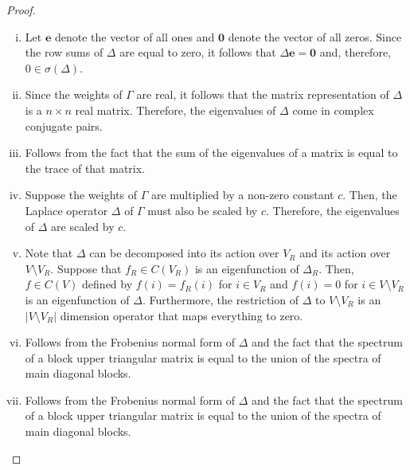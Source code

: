 \documentclass{article}
\newcommand\abs[1]{\left|#1\right|}
\begin{document}
\begin{proof}~
\begin{enumerate}[i.]
\item	Let $\textbf{e}$ denote the vector of all ones and $\textbf{0}$ denote the vector of all zeros. 
	Since the row sums of $\Delta$ are equal to zero, it follows that $\Delta\textbf{e}=\textbf{0}$ and, therefore, $0\in\sigma(\Delta)$.
\item	Since the weights of $\Gamma$ are real, it follows that the matrix representation of $\Delta$ is a $n\times n$ real matrix. 
	Therefore, the eigenvalues of $\Delta$ come in complex conjugate pairs.
\item	Follows from the fact that the sum of the eigenvalues of a matrix is equal to the trace of that matrix. 
\item	Suppose the weights of $\Gamma$ are multiplied by a non-zero constant $c$.
	Then, the Laplace operator $\Delta$ of $\Gamma$ must also be scaled by $c$.
	Therefore, the eigenvalues of $\Delta$ are scaled by $c$.
\item	Note that $\Delta$ can be decomposed into its action over $V_{R}$ and its action over $V\setminus{V_{R}}$.
	Suppose that $f_{R}\in C(V_{R})$ is an eigenfunction of $\Delta_{R}$.
	Then, $f\in C(V)$ defined by $f(i)=f_{R}(i)$ for $i\in V_{R}$ and $f(i)=0$ for $i\in V\setminus{V_{R}}$ is an eigenfunction of $\Delta$.
	Furthermore, the restriction of $\Delta$ to $V\setminus{V_{R}}$ is an $\abs{V\setminus{V_{R}}}$ dimension operator that maps everything to zero. 
\item	Follows from the Frobenius normal form of $\Delta$ and the fact that the spectrum of a block upper triangular matrix is equal to the union of the spectra of main diagonal blocks.
\item	Follows from the Frobenius normal form of $\Delta$ and the fact that the spectrum of a block upper triangular matrix is equal to the union of the spectra of main diagonal blocks. 
\end{enumerate}
\end{proof}
\end{document}
